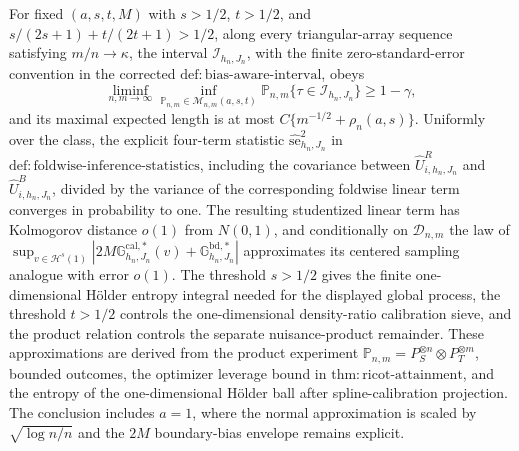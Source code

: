 For fixed \((a,s,t,M)\) with \(s>1/2\), \(t>1/2\), and \(s/(2s+1)+t/(2t+1)>1/2\), along every triangular-array sequence satisfying \(m/n\to\kappa\), the interval \(\mathcal I_{h_n,J_n}\), with the finite zero-standard-error convention in the corrected \(\mathrm{def:bias\text{-}aware\text{-}interval}\), obeys \[\liminf_{n,m\to\infty}\inf_{\mathbb P_{n,m}\in\mathcal M_{n,m}(a,s,t)}\mathbb P_{n,m}\{\tau\in\mathcal I_{h_n,J_n}\}\ge1-\gamma,\] and its maximal expected length is at most \(C\{m^{-1/2}+\rho_n(a,s)\}\). Uniformly over the class, the explicit four-term statistic \(\widehat{\mathrm{se}}_{h_n,J_n}^2\) in \(\mathrm{def:foldwise\text{-}inference\text{-}statistics}\), including the covariance between \(\widehat U^R_{i,h_n,J_n}\) and \(\widehat U^B_{i,h_n,J_n}\), divided by the variance of the corresponding foldwise linear term converges in probability to one. The resulting studentized linear term has Kolmogorov distance \(o(1)\) from \(N(0,1)\), and conditionally on \(\mathcal D_{n,m}\) the law of \(\sup_{v\in\mathcal H^s(1)}|2M\mathbb G^{\mathrm{cal},*}_{h_n,J_n}(v)+\mathbb G^{\mathrm{bd},*}_{h_n,J_n}|\) approximates its centered sampling analogue with error \(o(1)\). The threshold \(s>1/2\) gives the finite one-dimensional Hölder entropy integral needed for the displayed global process, the threshold \(t>1/2\) controls the one-dimensional density-ratio calibration sieve, and the product relation controls the separate nuisance-product remainder. These approximations are derived from the product experiment \(\mathbb P_{n,m}=P_S^{\otimes n}\otimes P_T^{\otimes m}\), bounded outcomes, the optimizer leverage bound in \(\mathrm{thm:ricot\text{-}attainment}\), and the entropy of the one-dimensional Hölder ball after spline-calibration projection. The conclusion includes \(a=1\), where the normal approximation is scaled by \(\sqrt{\log n/n}\) and the \(2M\) boundary-bias envelope remains explicit.